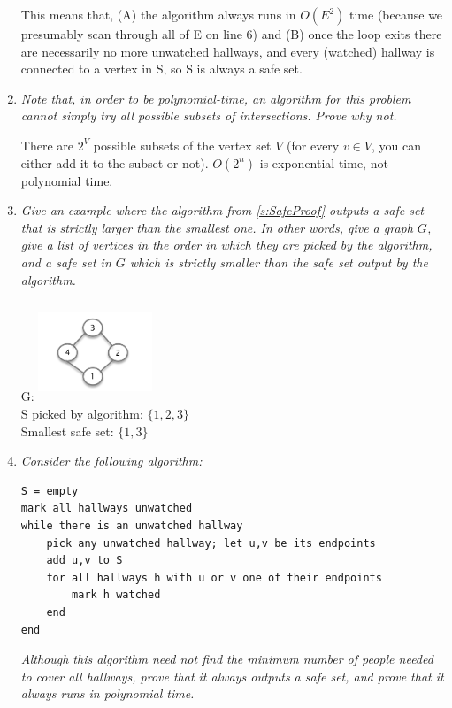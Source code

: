 \documentclass[12pt]{article} \setlength{\oddsidemargin}{0in}
\begin{document}
\begin{enumerate}
This means that, (A) the algorithm always runs in $O(E^2)$ time (because we presumably scan through all of E on line 6) and (B) once the loop exits there are necessarily no more unwatched hallways, and every (watched) hallway is connected to a vertex in S, so S is always a safe set. 

\item\textit{Note that, in order to be polynomial-time, an algorithm for this problem cannot simply try all possible subsets of intersections. Prove why not.}

There are $2^V$ possible subsets of the vertex set $V$ (for every $v \in V$, you can either add it to the subset or not). $O(2^n)$ is exponential-time, not polynomial time.

\item\textit{Give an example where the algorithm from \ref{s:SafeProof} outputs a safe set that is strictly larger than the smallest one. In other words, give a graph $G$, give a list of vertices in the order in which they are picked by the algorithm, and a safe set in $G$ which is strictly smaller than the safe set output by the algorithm.}

G: \includegraphics[width=3.4cm,height=3cm]{p3d} \\

S picked by algorithm: $\{1,2,3\}$\\

Smallest safe set: $\{1,3\}$

\pagebreak

\item\textit{Consider the following algorithm:}
\begin{verbatim}
S = empty
mark all hallways unwatched
while there is an unwatched hallway
    pick any unwatched hallway; let u,v be its endpoints
    add u,v to S
    for all hallways h with u or v one of their endpoints
        mark h watched
    end
end
\end{verbatim}
\textit{Although this algorithm need not find the minimum number of people needed to cover all hallways, prove that it always outputs a safe set, and prove that it always runs in polynomial time.}\label{s:SafeProof2}


\end{enumerate}
\end{document}
